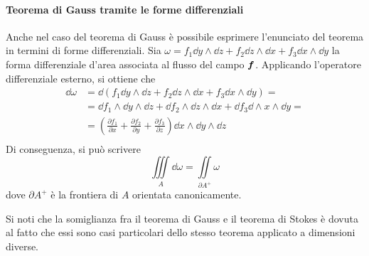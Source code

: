 \paragraph{Teorema di Gauss tramite le forme differenziali}

Anche nel caso del teorema di Gauss è possibile esprimere l'enunciato del teorema in termini di forme differenziali. Sia $\omega = f_1 \dd y \wedge \dd z + f_2 \dd z \wedge \dd x + f_3 \dd x \wedge \dd y$ la forma differenziale d'area associata al flusso del campo $\bm f$. Applicando l'operatore differenziale esterno, si ottiene che
\begin{align*}
	\dd \omega &=\dd(f_1 \dd y \wedge \dd z + f_2 \dd z \wedge \dd x + f_3 \dd x \wedge \dd y)=\\
	&=\dd f_1 \wedge \dd y \wedge \dd z+ \dd f_2\wedge\dd z \wedge \dd x+\dd f_3\dd\wedge x \wedge \dd y=\\
	&= \left(\frac{\partial f_1}{\partial x} + \frac{\partial f_2}{\partial y} + \frac{\partial f_3}{\partial z}\right)\dd x \wedge \dd y \wedge \dd z\\
\end{align*}
Di conseguenza, si può scrivere
$$
	\iiint\limits_A \dd \omega = \iint\limits_{\partial A^+}\omega
$$
dove $\partial A^+$ è la frontiera di $A$ orientata canonicamente.

\begin{remark}
	Si noti che la somiglianza fra il teorema di Gauss e il teorema di Stokes è dovuta al fatto che essi sono casi particolari dello stesso teorema applicato a dimensioni diverse.
\end{remark}